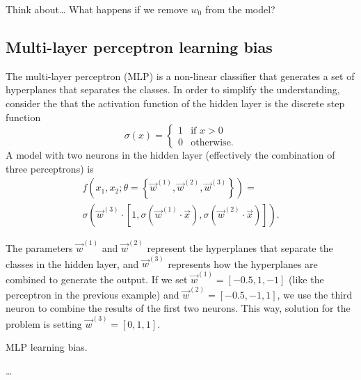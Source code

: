 \begin{mainbox}{Think about\dots}
  What happens if we remove $w_0$ from the model?
\end{mainbox}

\subsection{Multi-layer perceptron learning bias}

The multi-layer perceptron (MLP) is a non-linear classifier that generates a set of hyperplanes
that separates the classes.  In order to simplify the understanding, consider the
that the activation function of the hidden layer is the discrete step function
\begin{equation*}
  \sigma(x) = \begin{cases}
    1 & \text{if } x > 0 \\
    0 & \text{otherwise.}
  \end{cases}
\end{equation*}
A model with two neurons in the hidden layer (effectively the combination of three
perceptrons) is
\begin{multline*}
  f(x_1, x_2; \theta = \left\{ \vec{w}^{(1)}, \vec{w}^{(2)}, \vec{w}^{(3)} \right\}) = \\
  \sigma\left(
    \vec{w}^{(3)} \cdot \left[1, \sigma(\vec{w}^{(1)} \cdot \vec{x}), \sigma(\vec{w}^{(2)} \cdot \vec{x})\right]
  \right)\text{.}
\end{multline*}

The parameters $\vec{w}^{(1)}$ and $\vec{w}^{(2)}$ represent the hyperplanes that separate
the classes in the hidden layer, and $\vec{w}^{(3)}$ represents how the hyperplanes are
combined to generate the output.  If we set $\vec{w}^{(1)} = [-0.5, 1, -1]$ (like the
perceptron in the previous example) and $\vec{w}^{(2)} = [-0.5, -1, 1]$, we use the third neuron
to combine the results of the first two neurons.  This way, solution for the problem is
setting $\vec{w}^{(3)} = [0, 1, 1]$.

\begin{figurebox}[label=fig:mlp]{MLP learning bias.}
  \centering
  \tcblower
  \dots
\end{figurebox}

